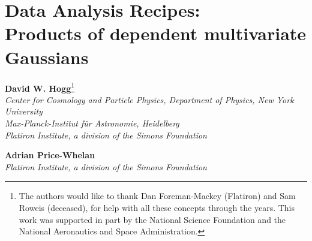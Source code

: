 \newcommand{\va}{\vector{a}}
\newcommand{\vb}{\vector{b}}
\newcommand{\vm}{\vector{m}}
\newcommand{\vx}{\vector{x}}
\newcommand{\vy}{\vector{y}}
\newcommand{\vz}{\vector{z}}
\newcommand{\vmu}{\vector{\mu}}
\newcommand{\veta}{\vector{\eta}}
\newcommand{\vtheta}{\vector{\theta}}
\newcommand{\tA}{\tensor{A}}
\newcommand{\tB}{\tensor{B}}
\newcommand{\tC}{\tensor{C}}
\newcommand{\tD}{\tensor{D}}
\newcommand{\tI}{\tensor{I}}
\newcommand{\tQ}{\tensor{Q}}
\newcommand{\tS}{\tensor{S}}
\newcommand{\tH}{\tensor{H}}
\newcommand{\tLambda}{\tensor{\Lambda}}
\newcommand{\mM}{\matrix{M}}
\newcommand{\mN}{\matrix{N}}
\newcommand{\mU}{\matrix{U}}
\newcommand{\mV}{\matrix{V}}
\newcommand{\bP}{\ensuremath{\textrm{\ding{170}}}} %
\newcommand{\bH}{\ensuremath{\textrm{\ding{114}}}} %

\addtolength{\topmargin}{-0.75in}
\addtolength{\textheight}{1.5in}
\setlength{\parindent}{\baselineskip}
\raggedbottom\sloppy\sloppypar\frenchspacing

\usepackage{color}
\newcommand{\todo}[1]{\textcolor{BrickRed}{[TODO: #1]}}
\newcommand{\bl}[1]{\textcolor{red}{[BL says: #1]}}
\newcommand{\hogg}[1]{\textcolor{magenta}{[Hogg says: #1]}}



\section*{Data Analysis Recipes:\\ Products of dependent multivariate Gaussians}

\noindent\textbf{David W. Hogg}\footnote{%
The authors would like to thank
  Dan Foreman-Mackey (Flatiron) and
  Sam Roweis (deceased),
for help with all these concepts through the years.
This work was supported in part by the National Science Foundation
and the National Aeronautics and Space Administration.
}\\
{\footnotesize%
  \textsl{Center for Cosmology and Particle Physics, Department of Physics, New York University}\\
  \textsl{Max-Planck-Institut f\"ur Astronomie, Heidelberg}\\
  \textsl{Flatiron Institute, a division of the Simons Foundation}%
}

\medskip\noindent\textbf{Adrian Price-Whelan}\\
{\footnotesize%
  \textsl{Flatiron Institute, a division of the Simons Foundation}%
}

